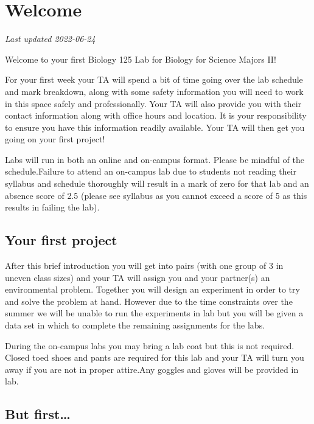 \documentclass[
]{book}
\begin{document}
\hypertarget{welcome-1}{%
\chapter*{Welcome}\label{welcome-1}}

\emph{Last updated 2022-06-24}

Welcome to your first Biology 125 Lab for Biology for Science Majors II!

For your first week your TA will spend a bit of time going over the lab schedule and mark breakdown, along with some safety information you will need to work in this space safely and professionally. Your TA will also provide you with their contact information along with office hours and location. It is your responsibility to ensure you have this information readily available. Your TA will then get you going on your first project!

Labs will run in both an online and on-campus format. Please be mindful of the schedule.Failure to attend an on-campus lab due to students not reading their syllabus and schedule thoroughly will result in a mark of zero for that lab and an absence score of 2.5 (please see syllabus as you cannot exceed a score of 5 as this results in failing the lab).

\hypertarget{your-first-project}{%
\section*{Your first project}\label{your-first-project}}

After this brief introduction you will get into pairs (with one group of 3 in uneven class sizes) and your TA will assign you and your partner(s) an environmental problem. Together you will design an experiment in order to try and solve the problem at hand. However due to the time constraints over the summer we will be unable to run the experiments in lab but you will be given a data set in which to complete the remaining assignments for the labs.

During the on-campus labs you may bring a lab coat but this is not required. Closed toed shoes and pants are required for this lab and your TA will turn you away if you are not in proper attire.Any goggles and gloves will be provided in lab.

\hypertarget{but-first}{%
\section*{But first\ldots{}}\label{but-first}}
\end{document}
